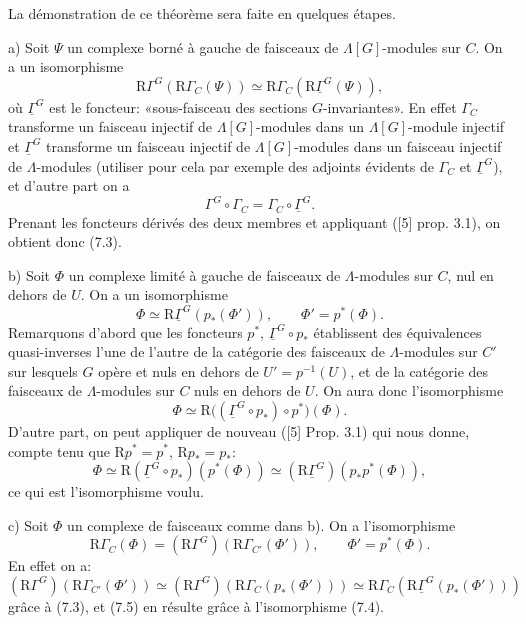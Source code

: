 \documentclass[11pt]{article}
\newcommand{\R}{\mathrm{R}}\newcommand{\RHomCore}{\mathrm{RHom}}
\providecommand{\R}{\mathrm R}
\providecommand{\RG}{\R\Gamma}
\begin{document}
La démonstration de ce théorème sera faite en quelques étapes.

a) Soit $\Psi$ un complexe borné à gauche de faisceaux de $\Lambda[G]$-modules sur $C$. On a un isomorphisme
\[
\R\Gamma^G(\RG_C(\Psi))\simeq\RG_C(\R\underline{\Gamma}^G(\Psi)),
\tag{7.3}
\]
où $\underline{\Gamma}^G$ est le foncteur: «sous-faisceau des sections $G$-invariantes». En effet $\Gamma_C$ transforme un faisceau injectif de $\Lambda[G]$-modules dans un $\Lambda[G]$-module injectif et $\underline{\Gamma}^G$ transforme un faisceau injectif de $\Lambda[G]$-modules dans un faisceau injectif de $\Lambda$-modules (utiliser pour cela par exemple des adjoints évidents de $\Gamma_C$ et $\underline{\Gamma}^G$), et d'autre part on a
\[
\Gamma^G\circ\Gamma_C=\Gamma_C\circ\underline{\Gamma}^G.
\]
Prenant les foncteurs dérivés des deux membres et appliquant ([5] prop. 3.1), on obtient donc (7.3).

b) Soit $\Phi$ un complexe limité à gauche de faisceaux de $\Lambda$-modules sur $C$, nul en dehors de $U$. On a un isomorphisme
\[
\Phi\simeq \R\underline{\Gamma}^G(p_*(\Phi')),
\qquad \Phi'=p^*(\Phi).
\tag{7.4}
\]
Remarquons d'abord que les foncteurs $p^*$, $\underline{\Gamma}^G\circ p_*$ établissent des équivalences quasi-inverses l'une de l'autre de la catégorie des faisceaux de $\Lambda$-modules sur $C'$ sur lesquels $G$ opère et nuls en dehors de $U'=p^{-1}(U)$, et de la catégorie des faisceaux de $\Lambda$-modules sur $C$ nuls en dehors de $U$. On aura donc l'isomorphisme
\[
\Phi\simeq \R\bigl((\underline{\Gamma}^G\circ p_*)\circ p^*\bigr)(\Phi).
\]
D'autre part, on peut appliquer de nouveau ([5] Prop. 3.1) qui nous donne, compte tenu que $\R p^*=p^*$, $\R p_*=p_*$:
\[
\Phi\simeq \R(\underline{\Gamma}^G\circ p_*)(p^*(\Phi))
\simeq (\R\underline{\Gamma}^G)(p_*p^*(\Phi)),
\]
ce qui est l'isomorphisme voulu.

c) Soit $\Phi$ un complexe de faisceaux comme dans b). On a l'isomorphisme
\[
\RG_C(\Phi)=(\R\Gamma^G)(\RG_{C'}(\Phi')),
\qquad \Phi'=p^*(\Phi).
\tag{7.5}
\]
En effet on a:
\[
(\R\Gamma^G)(\RG_{C'}(\Phi'))
\simeq
(\R\Gamma^G)(\RG_C(p_*(\Phi')))
\simeq
\RG_C(\R\underline{\Gamma}^G(p_*(\Phi')))
\]
grâce à (7.3), et (7.5) en résulte grâce à l'isomorphisme (7.4).
\end{document}
